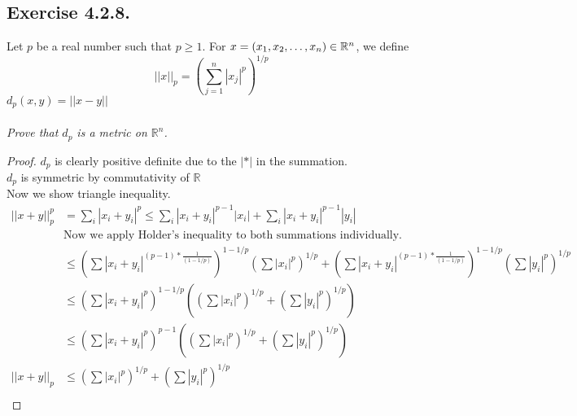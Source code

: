 \documentclass[12pt, a4paper]{article}
\newcommand{\mbr}{\mathbb{R}}
\begin{document}
    \subsection*{Exercise 4.2.8.}
    Let $p$ be a real number such that $ p \ge 1$. For $x = (x_1, x_2, \mathellipsis,x_n) \in \mbr^n$, 
    we define $$||x||_p = (\sum_{j=1}^{n}{|x_j|^p})^{1/p}$$
    $d_p(x,y) = ||x-y||$\\\\
    \textit{Prove that $d_p$ is a metric on $\mbr^n$. }
    \begin{proof}
        $d_p$ is clearly positive definite due to the $|*|$ in the summation.\\
        $d_p$ is symmetric by commutativity of $\mbr$\\
        Now we show triangle inequality.
        \begin{align*}
        ||x + y||_p^p &= \sum_i|x_i+y_i|^p \le \sum_i{|x_i+y_i|}^{p-1}|x_i| + \sum_i{|x_i+y_i|}^{p-1}|y_i|\\
        &\text{Now we apply Holder's inequality to both summations individually.}\\
        &\le (\sum{|x_i+y_i|^{(p-1)*\frac{1}{(1-1/p)}}})^{1-1/p}(\sum{|x_i|}^p)^{1/p} + (\sum{|x_i+y_i|^{(p-1)*\frac{1}{(1-1/p)}}})^{1-1/p}(\sum{|y_i|}^p)^{1/p}\\
        &\le (\sum{|x_i+y_i|^{p}})^{1-1/p}((\sum{|x_i|}^p)^{1/p} + (\sum|y_i|^p)^{1/p})\\
        &\le (\sum{|x_i+y_i|^{p}})^{p-1}((\sum{|x_i|}^p)^{1/p} + (\sum|y_i|^p)^{1/p})\\
        ||x + y||_p &\le (\sum{|x_i|}^p)^{1/p} + (\sum|y_i|^p)^{1/p}\\
        \end{align*}
    \end{proof}
\end{document}
